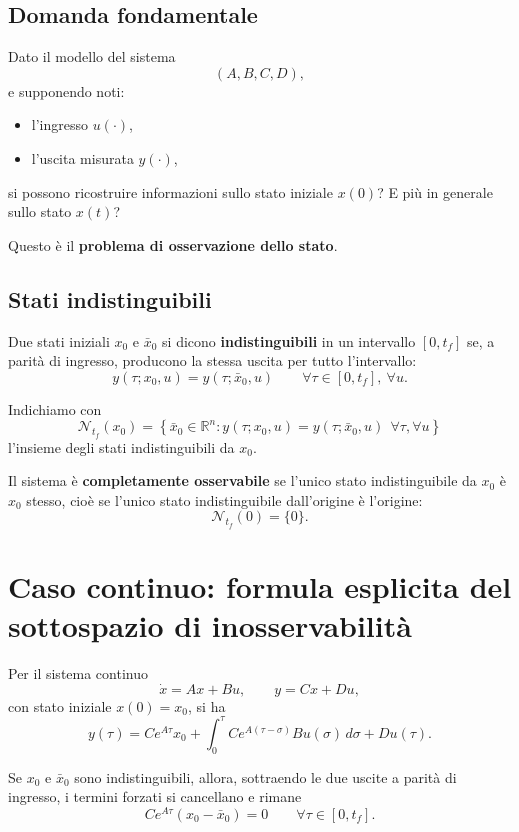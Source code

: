\subsection{Domanda fondamentale}

Dato il modello del sistema
\[
(A,B,C,D),
\]
e supponendo noti:
\begin{itemize}
    \item l’ingresso \(u(\cdot)\),
    \item l’uscita misurata \(y(\cdot)\),
\end{itemize}
si possono ricostruire informazioni sullo stato iniziale \(x(0)\)?  
E più in generale sullo stato \(x(t)\)?

Questo è il \textbf{problema di osservazione dello stato}.

\subsection{Stati indistinguibili}

Due stati iniziali \(x_0\) e \(\bar x_0\) si dicono \textbf{indistinguibili} in un intervallo \([0,t_f]\) se, a parità di ingresso, producono la stessa uscita per tutto l’intervallo:
\[
y(\tau; x_0,u)=y(\tau; \bar x_0,u)
\qquad
\forall \tau\in[0,t_f],\ \forall u.
\]

Indichiamo con
\[
\mathcal N_{t_f}(x_0)
=
\left\{
\bar x_0\in\mathbb R^n:
y(\tau; x_0,u)=y(\tau; \bar x_0,u)\ \ \forall \tau,\forall u
\right\}
\]
l’insieme degli stati indistinguibili da \(x_0\).

Il sistema è \textbf{completamente osservabile} se l’unico stato indistinguibile da \(x_0\) è \(x_0\) stesso, cioè se l’unico stato indistinguibile dall’origine è l’origine:
\[
\mathcal N_{t_f}(0)=\{0\}.
\]

\section{Caso continuo: formula esplicita del sottospazio di inosservabilità}

Per il sistema continuo
\[
\dot x=Ax+Bu,\qquad y=Cx+Du,
\]
con stato iniziale \(x(0)=x_0\), si ha
\[
y(\tau)=Ce^{A\tau}x_0+\int_0^\tau Ce^{A(\tau-\sigma)}Bu(\sigma)\,d\sigma + Du(\tau).
\]

Se \(x_0\) e \(\bar x_0\) sono indistinguibili, allora, sottraendo le due uscite a parità di ingresso, i termini forzati si cancellano e rimane
\[
Ce^{A\tau}(x_0-\bar x_0)=0
\qquad
\forall \tau\in[0,t_f].
\]

